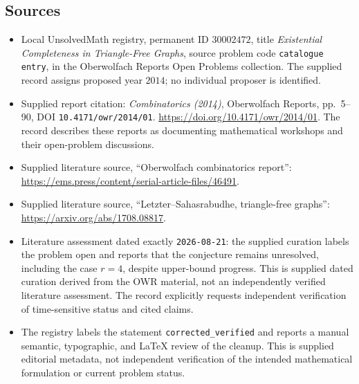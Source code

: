 \documentclass[11pt]{article}
\begin{document}
\subsection{Sources}
\begin{itemize}
\item Local UnsolvedMath registry, permanent ID \(30002472\), title \emph{Existential Completeness in Triangle-Free Graphs}, source problem code \texttt{catalogue entry}, in the Oberwolfach Reports Open Problems collection. The supplied record assigns proposed year \(2014\); no individual proposer is identified.
\item Supplied report citation: \emph{Combinatorics (2014)}, Oberwolfach Reports, pp.\ 5--90, DOI \texttt{10.4171/owr/2014/01}. \url{https://doi.org/10.4171/owr/2014/01}. The record describes these reports as documenting mathematical workshops and their open-problem discussions.
\item Supplied literature source, ``Oberwolfach combinatorics report'': \url{https://ems.press/content/serial-article-files/46491}.
\item Supplied literature source, ``Letzter--Sahasrabudhe, triangle-free graphs'': \url{https://arxiv.org/abs/1708.08817}.
\item Literature assessment dated exactly \texttt{2026-08-21}: the supplied curation labels the problem open and reports that the conjecture remains unresolved, including the case \(r=4\), despite upper-bound progress. This is supplied dated curation derived from the OWR material, not an independently verified literature assessment. The record explicitly requests independent verification of time-sensitive status and cited claims.
\item The registry labels the statement \texttt{corrected\_verified} and reports a manual semantic, typographic, and LaTeX review of the cleanup. This is supplied editorial metadata, not independent verification of the intended mathematical formulation or current problem status.
\end{itemize}
\end{document}
